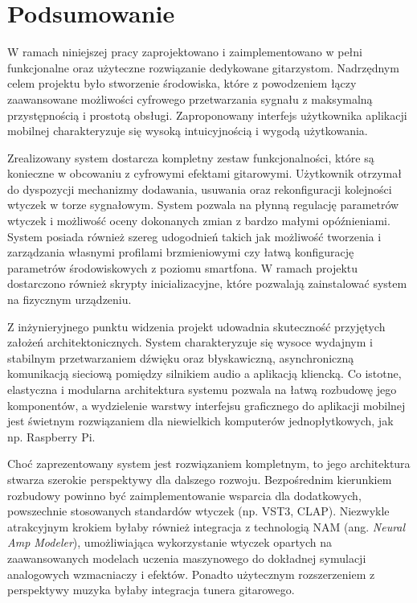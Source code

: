 \documentclass[12pt,a4paper]{report}
\begin{document}
\chapter*{Podsumowanie}
W ramach niniejszej pracy zaprojektowano i zaimplementowano w pełni
funkcjonalne oraz użyteczne rozwiązanie dedykowane gitarzystom.
Nadrzędnym celem projektu było stworzenie środowiska, które z
powodzeniem łączy zaawansowane możliwości cyfrowego przetwarzania
sygnału z maksymalną przystępnością i prostotą obsługi. Zaproponowany
interfejs użytkownika aplikacji mobilnej charakteryzuje się wysoką
intuicyjnością i wygodą użytkowania.

Zrealizowany system dostarcza kompletny zestaw funkcjonalności, które
są konieczne w obcowaniu z cyfrowymi efektami gitarowymi. Użytkownik
otrzymał do dyspozycji mechanizmy dodawania, usuwania oraz
rekonfiguracji kolejności wtyczek w torze sygnałowym. System pozwala
na płynną regulację parametrów wtyczek i możliwość oceny dokonanych
zmian z bardzo małymi opóźnieniami. System posiada również szereg
udogodnień takich jak możliwość tworzenia i zarządzania własnymi
profilami brzmieniowymi czy łatwą konfigurację parametrów
środowiskowych z poziomu smartfona. W ramach projektu dostarczono
również skrypty
inicializacyjne, które pozwalają zainstalować system na fizycznym urządzeniu.

Z inżynieryjnego punktu widzenia projekt udowadnia skuteczność
przyjętych założeń architektonicznych.
System charakteryzuje się wysoce wydajnym i stabilnym przetwarzaniem
dźwięku oraz błyskawiczną, asynchroniczną komunikacją sieciową
pomiędzy silnikiem audio a aplikacją kliencką. Co istotne, elastyczna
i modularna architektura systemu pozwala na łatwą rozbudowę jego
komponentów, a wydzielenie warstwy interfejsu graficznego do
aplikacji mobilnej jest świetnym rozwiązaniem dla niewielkich
komputerów jednopłytkowych, jak np. Raspberry Pi.

Choć zaprezentowany system jest rozwiązaniem kompletnym, to jego
architektura stwarza szerokie perspektywy dla dalszego rozwoju.
Bezpośrednim kierunkiem rozbudowy powinno być zaimplementowanie
wsparcia dla dodatkowych, powszechnie stosowanych standardów wtyczek
(np. VST3, CLAP). Niezwykle atrakcyjnym krokiem byłaby również
integracja z technologią NAM (ang. \textit{Neural Amp Modeler}),
umożliwiająca wykorzystanie wtyczek opartych na zaawansowanych
modelach uczenia maszynowego do dokładnej symulacji analogowych
wzmacniaczy i efektów. Ponadto użytecznym rozszerzeniem z perspektywy
muzyka byłaby integracja tunera gitarowego.

\printbibliography[heading=bibintoc,title={Bibliografia}]
\end{document}
